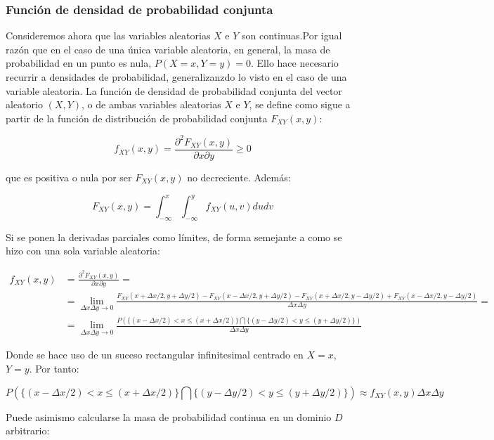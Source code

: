 \documentclass[11pt]{article}
\begin{document}
    \hypertarget{funciuxf3n-de-densidad-de-probabilidad-conjunta}{%
\subsubsection{Función de densidad de probabilidad
conjunta}\label{funciuxf3n-de-densidad-de-probabilidad-conjunta}}

Consideremos ahora que las variables aleatorias \(X\) e \(Y\) son
continuas.Por igual razón que en el caso de una única variable
aleatoria, en general, la masa de probabilidad en un punto es nula,
\(P(X=x, Y=y)=0\). Ello hace necesario recurrir a densidades de
probabilidad, generalizanzdo lo visto en el caso de una variable
aleatoria. La función de densidad de probabilidad conjunta del vector
aleatorio \((X, Y)\), o de ambas variables aleatorias \(X\) e \(Y\), se
define como sigue a partir de la función de distribución de probabilidad
conjunta \(F_{XY}(x,y)\):

\[
f_{XY}(x, y)=\frac{\partial^{2} F_{XY}(x, y)}{\partial x \partial y }\geq 0
\]

que es positiva o nula por ser \(F_{XY}(x,y)\) no decreciente. Además:

\[
F_{XY}(x, y)=\int_{-\infty}^{x} \int_{-\infty}^{y} f_{XY}(u, v) du dv
\]

    Si se ponen la derivadas parciales como límites, de forma semejante a
como se hizo con una sola variable aleatoria:

\begin{align*}
f_{XY}(x, y) &= \frac{\partial^{2} F_{XY}(x, y)}{\partial x \partial y } = \\
 &= \lim \limits_{\Delta x \Delta y \to 0} \frac{F_{XY}(x+\Delta x/2, y+\Delta y/2)-F_{XY}(x-\Delta x/2, y+\Delta y/2)-F_{XY}(x+\Delta x/2, y-\Delta y/2)+F_{XY}(x-\Delta x/2, y-\Delta y/2)}{\Delta x \Delta y}= \\ 
&= \lim \limits_{\Delta x \Delta y \to 0} \frac{P\left(\{(x-\Delta x/2) < x \leq (x+\Delta x/2)\} \bigcap \{(y-\Delta y/2) < y \leq (y+\Delta y/2)\} \right)}{\Delta x \Delta y} 
\end{align*}


Donde se hace uso de un suceso rectangular infinitesimal centrado en
\(X=x\), \(Y=y\). Por tanto:

\[
P\left(\{(x-\Delta x/2) < x \leq (x+\Delta x/2)\} \bigcap \{(y-\Delta y/2) < y \leq (y+\Delta y/2)\} \right) \approx f_{XY}(x, y) \Delta x \Delta y
\]

    Puede asimismo calcularse la masa de probabilidad continua en un dominio
\(D\) arbitrario:
\end{document}
